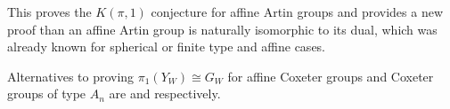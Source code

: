 \documentclass[class=guthesis, crop=false]{standalone}
\begin{document}
This proves the $K(\pi, 1)$ conjecture for affine Artin groups and provides a new proof than an affine Artin group is naturally isomorphic to its dual, which was already known for spherical or finite type \cite{bessis_dual_2003} and affine \cite{mccammond_sulway_artin_2017} cases.

Alternatives to \cite{brieskorn_fundamentalgruppe_1971} proving $\pi_1(Y_W) \cong G_W$ for affine Coxeter groups and Coxeter groups of type $A_n$ are \cite{vietdung_fundamental_1983} and \cite{fox_neuwirth_braid_1962} respectively.
\end{document}

